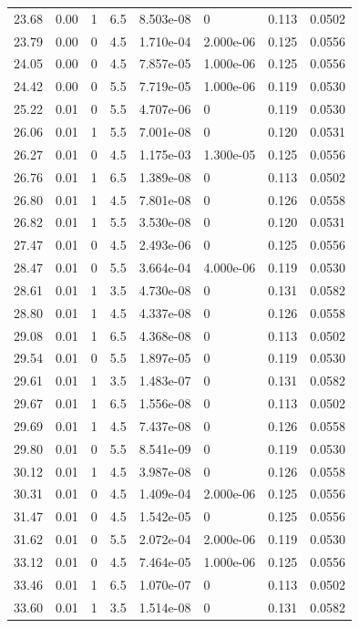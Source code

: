 \documentclass[preview]{standalone}
\begin{document}
{{{\begin{tabular}{L{1.2cm}C{1.2cm} C{0.3cm}C{0.5cm} C{1.4cm}C{1.4cm} C{1.4cm}C{1.4cm}}
  23.68  &  0.00  & 1     & 6.5 &  8.503e-08  & 0  & 0.113 &  0.0502   \\ 
  23.79  &  0.00  & 0     & 4.5 &  1.710e-04  & 2.000e-06  & 0.125 &  0.0556   \\ 
  24.05  &  0.00  & 0     & 4.5 &  7.857e-05  & 1.000e-06  & 0.125 &  0.0556   \\ 
  24.42  &  0.00  & 0     & 5.5 &  7.719e-05  & 1.000e-06  & 0.119 &  0.0530   \\ 
  25.22  &  0.01  & 0     & 5.5 &  4.707e-06  & 0  & 0.119 &  0.0530   \\ 
  26.06  &  0.01  & 1     & 5.5 &  7.001e-08  & 0  & 0.120 &  0.0531   \\ 
  26.27  &  0.01  & 0     & 4.5 &  1.175e-03  & 1.300e-05  & 0.125 &  0.0556   \\ 
  26.76  &  0.01  & 1     & 6.5 &  1.389e-08  & 0  & 0.113 &  0.0502   \\ 
  26.80  &  0.01  & 1     & 4.5 &  7.801e-08  & 0  & 0.126 &  0.0558   \\ 
  26.82  &  0.01  & 1     & 5.5 &  3.530e-08  & 0  & 0.120 &  0.0531   \\ 
  27.47  &  0.01  & 0     & 4.5 &  2.493e-06  & 0  & 0.125 &  0.0556   \\ 
  28.47  &  0.01  & 0     & 5.5 &  3.664e-04  & 4.000e-06  & 0.119 &  0.0530   \\ 
  28.61  &  0.01  & 1     & 3.5 &  4.730e-08  & 0  & 0.131 &  0.0582   \\ 
  28.80  &  0.01  & 1     & 4.5 &  4.337e-08  & 0  & 0.126 &  0.0558   \\ 
  29.08  &  0.01  & 1     & 6.5 &  4.368e-08  & 0  & 0.113 &  0.0502   \\ 
  29.54  &  0.01  & 0     & 5.5 &  1.897e-05  & 0  & 0.119 &  0.0530   \\ 
  29.61  &  0.01  & 1     & 3.5 &  1.483e-07  & 0  & 0.131 &  0.0582   \\ 
  29.67  &  0.01  & 1     & 6.5 &  1.556e-08  & 0  & 0.113 &  0.0502   \\ 
  29.69  &  0.01  & 1     & 4.5 &  7.437e-08  & 0  & 0.126 &  0.0558   \\ 
  29.80  &  0.01  & 0     & 5.5 &  8.541e-09  & 0  & 0.119 &  0.0530   \\ 
  30.12  &  0.01  & 1     & 4.5 &  3.987e-08  & 0  & 0.126 &  0.0558   \\ 
  30.31  &  0.01  & 0     & 4.5 &  1.409e-04  & 2.000e-06  & 0.125 &  0.0556   \\ 
  31.47  &  0.01  & 0     & 4.5 &  1.542e-05  & 0  & 0.125 &  0.0556   \\ 
  31.62  &  0.01  & 0     & 5.5 &  2.072e-04  & 2.000e-06  & 0.119 &  0.0530   \\ 
  33.12  &  0.01  & 0     & 4.5 &  7.464e-05  & 1.000e-06  & 0.125 &  0.0556   \\ 
  33.46  &  0.01  & 1     & 6.5 &  1.070e-07  & 0  & 0.113 &  0.0502   \\ 
  33.60  &  0.01  & 1     & 3.5 &  1.514e-08  & 0  & 0.131 &  0.0582   \\ 
\hline 
\end{tabular} 

}}}
\end{document}
